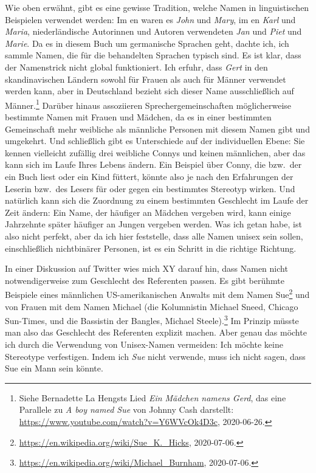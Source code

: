 Wie oben erwähnt, gibt es eine gewisse Tradition, welche Namen in linguistischen Beispielen verwendet
werden: Im en waren es \emph{John} und \emph{Mary}, im en \emph{Karl} und
\emph{Maria}, niederländische Autorinnen und Autoren verwendeten \emph{Jan} und \emph{Piet} und
\emph{Marie}. Da es in diesem Buch um germanische Sprachen geht, dachte ich, ich sammle Namen,
die für die behandelten Sprachen typisch sind. Es ist klar, dass der Namenstrick nicht global
funktioniert. Ich erfuhr, dass \emph{Gert} in den skandinavischen Ländern sowohl für Frauen als
auch für Männer verwendet werden kann, aber in Deutschland bezieht sich dieser Name ausschließlich
auf Männer.\footnote{%
Siehe Bernadette La Hengsts Lied \emph{Ein Mädchen namens Gerd}, das eine Parallele zu \emph{A boy
  named Sue} von Johnny Cash darstellt: \url{https://www.youtube.com/watch?v=Y6WVcOk4D3c}, 2020-06-26.
} Darüber hinaus assoziieren Sprechergemeinschaften möglicherweise bestimmte Namen mit Frauen und
Mädchen, da es in einer bestimmten Gemeinschaft mehr weibliche als männliche Personen mit diesem Namen
gibt und umgekehrt. Und schließlich gibt es Unterschiede auf der individuellen Ebene: Sie kennen
vielleicht zufällig drei weibliche Connys und keinen männlichen, aber das kann sich im Laufe Ihres
Lebens ändern. Ein Beispiel über Conny, die bzw.\ der ein Buch liest oder ein Kind füttert, könnte
also je nach den Erfahrungen der Leserin bzw.\ des Lesers für oder gegen ein bestimmtes Stereotyp
wirken. Und natürlich kann sich die Zuordnung zu einem bestimmten Geschlecht im Laufe der Zeit
ändern: Ein Name, der häufiger an Mädchen vergeben wird, kann einige Jahrzehnte später häufiger an
Jungen vergeben werden. Was ich getan habe, ist also nicht perfekt, aber da ich hier feststelle, dass
alle Namen unisex sein sollen, einschließlich nichtbinärer Personen, ist es ein Schritt in die
richtige Richtung.

In einer Diskussion auf Twitter wies mich XY darauf hin, dass Namen nicht notwendigerweise zum
Geschlecht des Referenten passen. Es gibt berühmte Beispiele eines männlichen US-amerikanischen
Anwalts mit dem Namen Sue\footnote{
\url{https://en.wikipedia.org/wiki/Sue_K._Hicks}, 2020-07-06.
} und von Frauen mit dem Namen Michael (die Kolumnistin Michael Sneed, Chicago Sun-Times, und die
Bassistin der Bangles, Michael Steele).\footnote{
  \url{https://en.wikipedia.org/wiki/Michael_Burnham}, 2020-07-06.
}
Im Prinzip müsste man also das Geschlecht des Referenten explizit machen. Aber genau das möchte ich
durch die Verwendung von Unisex-Namen vermeiden: Ich möchte keine Stereotype verfestigen. Indem ich
\emph{Sue} nicht verwende, muss ich nicht sagen, dass Sue ein Mann sein könnte.

